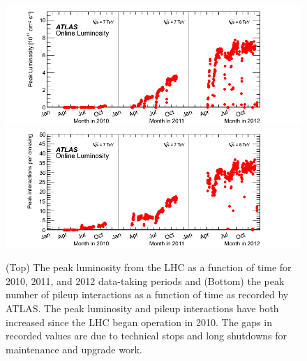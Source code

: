 \begin{figure}[ht]
\centering
\includegraphics[width=.995\textwidth]{figures/lhc/peaklumi_multiyear.png}
\includegraphics[width=.995\textwidth]{figures/lhc/peakmu_multiyear.png}
\caption{ (Top) The peak luminosity from the LHC as a function of time
for 2010, 2011, and 2012 data-taking periods and (Bottom)
the peak number of pileup interactions as a function of time
as recorded by ATLAS. The peak luminosity and pileup interactions
have both increased since the LHC began operation in 2010.
The gaps in recorded values are due to technical stops and long shutdowns
for maintenance and upgrade work.  }
\label{fig:lhc_conditions}
\end{figure}

